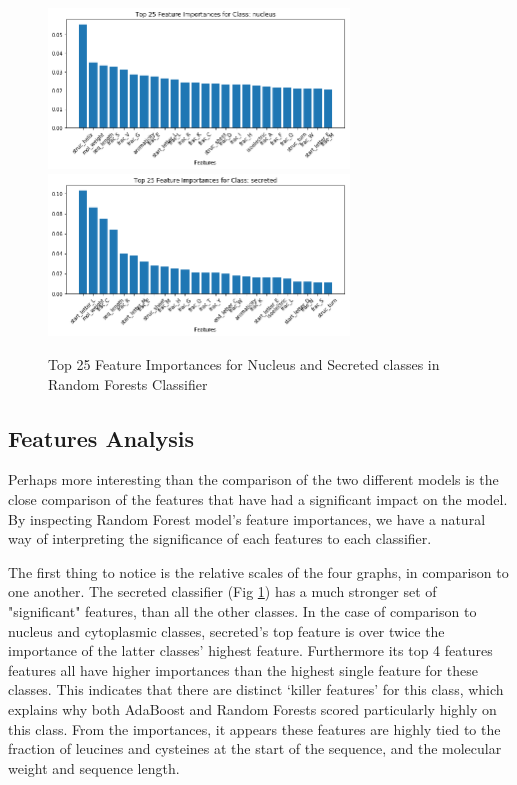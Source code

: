 \documentclass{bioinfo}
\begin{document}
\begin{figure}[t]
\includegraphics[width=8cm]{nucleus_import}
\centering
\includegraphics[width=8cm]{secreted_import}
\caption{Top 25 Feature Importances for Nucleus and Secreted classes in Random Forests Classifier}
\label{fig:import2}
\centering
\end{figure}


\subsection{Features Analysis}

Perhaps more interesting than the comparison of the two different models is the close comparison of the features that have had a significant impact on the model.
By inspecting Random Forest model's feature importances, we have a natural way of interpreting the significance of each features to each classifier.

The first thing to notice is the relative scales of the four graphs, in comparison to one another. The secreted classifier (Fig \ref{fig:import2}) has a much stronger set of "significant" features, than all the other classes. 
In the case of comparison to nucleus and cytoplasmic classes, secreted's top feature is over twice the importance of the latter classes' highest feature. 
Furthermore its top 4 features features all have higher importances than the highest single feature for these classes.  
This indicates that there are distinct `killer features' for this class, which explains why both AdaBoost and Random Forests scored particularly highly on this class.
From the importances, it appears these features are highly tied to the fraction of leucines and cysteines at the start of the sequence, and the molecular weight and sequence length.
\end{document}
